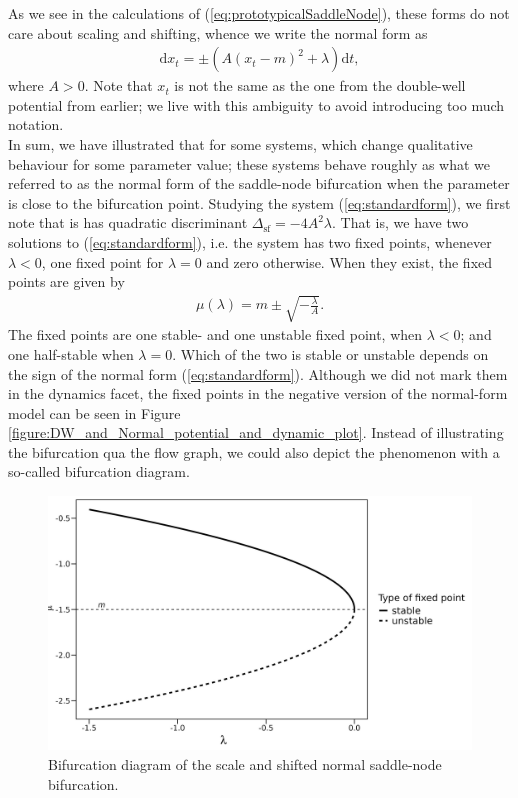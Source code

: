 As we see in the calculations of (\ref{eq:prototypicalSaddleNode}), these forms do not care about scaling and shifting, whence we write the normal form as
\begin{align}
    \mathrm{d}x_t = \pm\left(A\left(x_t - m\right)^2 + \lambda\right)\mathrm{d}t, \label{eq:standardform}
\end{align}
where $A>0$. Note that $x_t$ is not the same as the one from the double-well potential from earlier; we live with this ambiguity to avoid introducing too much notation.\\ In sum, we have illustrated that for some systems, which change qualitative behaviour for some parameter value; these systems behave roughly as what we referred to as the normal form of the saddle-node bifurcation when the parameter is close to the bifurcation point. Studying the system (\ref{eq:standardform}), we first note that is has quadratic discriminant $\Delta_{\mathrm{sf}} = -4A^2\lambda$. That is, we have two solutions to (\ref{eq:standardform}), i.e. the system has two fixed points, whenever $\lambda<0$, one fixed point for $\lambda = 0$ and zero otherwise. When they exist, the fixed points are given by
\begin{align}
    \mu\left(\lambda\right) = m \pm \sqrt{-\frac{\lambda}{A}}. \label{eq:fixedPoint}
\end{align}
The fixed points are one stable- and one unstable fixed point, when $\lambda<0$; and one half-stable when $\lambda=0$. Which of the two is stable or unstable depends on the sign of the normal form (\ref{eq:standardform}). Although we did not mark them in the dynamics facet, the fixed points in the negative version of the normal-form model can be seen in Figure \ref{figure:DW_and_Normal_potential_and_dynamic_plot}. Instead of illustrating the bifurcation qua the flow graph, we could also depict the phenomenon with a so-called bifurcation diagram.
\begin{figure}[h]
\begin{center}
    \includegraphics[scale = .11]{figures/bifurcation_diagram.jpeg}
    \caption{Bifurcation diagram of the scale and shifted normal saddle-node bifurcation.}
    \label{figure:bifurcationDiagram}
\end{center}
\end{figure}\\
